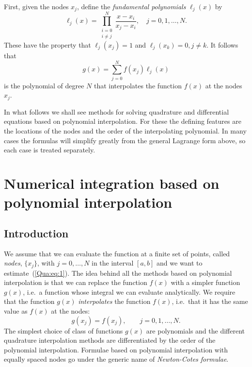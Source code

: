 First, given the nodes $x_j$, define the \textit{fundamental
  polynomials} $\ell_j(x)$ by
%
\begin{equation}
  \ell_j(x) = \prod_{\substack{i = 0\\i \ne j}}^N \frac{x - x_i}{x_j -
    x_i}, \quad j = 0, 1, \dots, N.
\end{equation}
%
These have the property that $\ell_j(x_j) = 1$ and $\ell_j(x_k) = 0, j
\ne k$. It follows that
%
\begin{equation}
  g(x) = \sum_{j=0}^N f(x_j) \ell_j(x)
\end{equation}
%
is the polynomial of degree $N$ that interpolates the function $f(x)$
at the nodes $x_j$.

In what follows we shall see methods for solving quadrature and
differential equations based on polynomial interpolation. For these
the defining features are the locations of the nodes and the order of
the interpolating polynomial. In many cases the formulas will simplify
greatly from the general Lagrange form above, so each case is treated
separately.

\section[Using polynomial interpolation]{Numerical integration based on polynomial interpolation}

\subsection{Introduction}

We assume that we can evaluate the function at a finite set of points,
called \textit{nodes}, $\{x_j\}$, with $j=0,\ldots, N$ in the interval
$[a,b]$ and we want to estimate~(\ref{Qua:eq:1}).  The idea behind all
the methods based on polynomial interpolation is that we can replace
the function $f(x)$ with a simpler function $g(x)$, i.e.\ a function
whose integral we can evaluate analytically.  We require that the
function $g(x)$ \textit{interpolates} the function $f(x)$, i.e.\ that
it has the same value as $f(x)$ at the nodes:
%
\begin{equation}
  g(x_j) = f(x_j) , \qquad j = 0,1,\ldots,N. \label{Qua:eq:3}
\end{equation}
%
The simplest choice of class of functions $g(x)$ are polynomials and
the different quadrature interpolation methods are differentiated by
the order of the polynomial interpolation.  Formulae based on
polynomial interpolation with equally spaced nodes go under the
generic name of \textit{Newton-Cotes formulae}.

